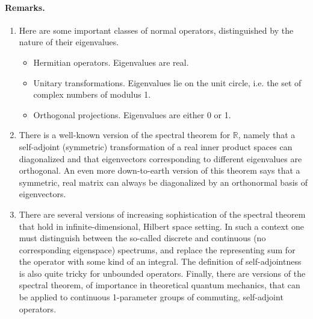 \documentclass[12pt]{article}
\newcommand{\reals}{\mathbb{R}}
\begin{document}
\paragraph{Remarks.}
\begin{enumerate}
\item Here are some important classes of normal operators,
  distinguished by the nature of their eigenvalues.
  \begin{itemize}
  \item Hermitian operators.  Eigenvalues are real.
  \item Unitary transformations.  Eigenvalues lie on the unit circle,
    i.e. the set of complex numbers of modulus 1.
  \item Orthogonal projections.  Eigenvalues are either 0 or 1.
  \end{itemize}
\item There is a well-known version of the spectral theorem for
  $\reals$, namely that a self-adjoint (symmetric) transformation of a
  real inner product spaces can diagonalized and that eigenvectors
  corresponding to different eigenvalues are orthogonal.  An even more
  down-to-earth version of this theorem says that a symmetric, real
  matrix can always be diagonalized by an orthonormal basis of
  eigenvectors. 
\item There are several versions of increasing sophistication of the
  spectral theorem that hold in infinite-dimensional, Hilbert space
  setting.  In such a context one must distinguish between the
  so-called discrete and continuous (no corresponding eigenspace)
  spectrums, and replace the representing sum for the operator with
  some kind of an integral. The definition of self-adjointness is also
  quite tricky for unbounded operators.  Finally, there are versions
  of the spectral theorem, of importance in theoretical quantum
  mechanics, that can be applied to continuous 1-parameter groups of
  commuting, self-adjoint operators.
\end{enumerate}
\end{document}
